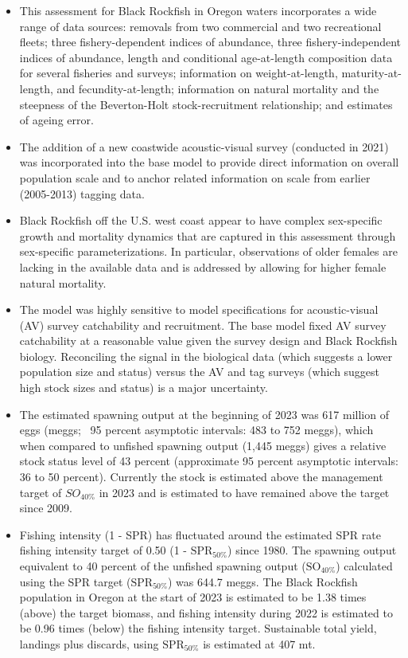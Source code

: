 \documentclass[11pt,
  english,
  letterpaper,
]{article}
\begin{document}
\begin{itemize}

\item This assessment for Black Rockfish in Oregon waters incorporates a wide range of data sources: removals from two commercial and two recreational fleets; three fishery-dependent indices of abundance, three fishery-independent indices of abundance, length and conditional age-at-length composition data for several fisheries and surveys; information on weight-at-length, maturity-at-length, and fecundity-at-length; information on natural mortality and the steepness of the Beverton-Holt stock-recruitment relationship; and estimates of ageing error.

\item The addition of a new coastwide acoustic-visual survey (conducted in 2021) was incorporated into the base model to provide direct information on overall population scale and to anchor related information on scale from earlier (2005-2013) tagging data.   

\item Black Rockfish off the U.S. west coast appear to have complex sex-specific growth and mortality dynamics that are captured in this assessment through sex-specific parameterizations. In particular, observations of older females are lacking in the available data and is addressed by allowing for higher female natural mortality.

\item The model was highly sensitive to model specifications for acoustic-visual (AV) survey catchability and recruitment. The base model fixed AV survey catchability at a reasonable value given the survey design and Black Rockfish biology. Reconciling the signal in the
biological data (which suggests a lower population size and status) versus the AV and tag surveys (which suggest high stock sizes and status) is a major uncertainty.  

\item The estimated spawning output at the beginning of 2023 was 617 million of eggs (meggs; ~95 percent asymptotic intervals: 483 to 752 meggs), which when compared to unfished spawning output (1,445 meggs) gives a relative stock status level of 43 percent (approximate 95 percent asymptotic intervals: 36 to 50 percent).  Currently the stock is estimated above the management target of $SO_{40\%}$ in 2023 and is estimated to have remained above the target since 2009.

\item  Fishing intensity (1 - SPR) has fluctuated around the estimated SPR rate fishing intensity target of 0.50 (1 - $\text{SPR}_{50\%}$) since 1980. The spawning output equivalent to 40 percent of the unfished spawning output ($\text{SO}_{40\%}$) calculated using the SPR target ($\text{SPR}_{50\%}$) was 644.7 meggs. The Black Rockfish population in Oregon at the start of 2023 is estimated to be 1.38 times (above) the target biomass, and fishing intensity during 2022 is estimated to be 0.96 times (below) the fishing intensity target. Sustainable total yield, landings plus discards, using $\text{SPR}_{50\%}$ is estimated at 407 mt.   

\end{itemize}
\end{document}
